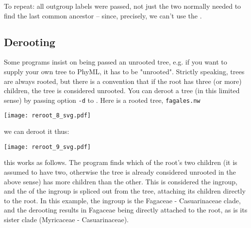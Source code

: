 \noindent{}To repeat: all outgroup labels were passed, not just the two
normally needed to find the last common ancestor -- since, precisely, we can't
use the \lca.

\subsection{Derooting}

Some programs insist on being passed an unrooted tree, e.g. if you want to
supply your own tree to PhyML, it has to be "unrooted". Strictly speaking,
\nw{} trees are always rooted, but there is a convention that if the root has
three (or more) children, the tree is considered unrooted. You can deroot a
tree (in this limited sense) by passing option \texttt{-d} to \reroot{}. Here
is a rooted tree, \texttt{fagales.nw}

\begin{center}
\texttt{[image: reroot\_8\_svg.pdf]}
\end{center}

\noindent{}we can deroot it thus:


\begin{center}
\texttt{[image: reroot\_9\_svg.pdf]}
\end{center}

\noindent{}this works as follows. The program finds which of the root's two
children (it is assumed to have two, otherwise the tree is already considered
unrooted in the above sense) has more children than the other. This is
considered the ingroup, and the \lca{} of the ingroup is spliced out from the
tree, attaching its children directly to the root. In this example, the ingroup
is the Fagaceae - Casuarinaceae clade, and the derooting results in Fagaceae
being directly attached to the root, as is its sister clade (Myricaceae -
Casuarinaceae).
